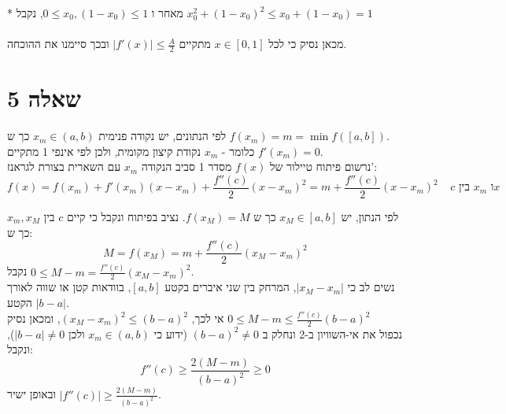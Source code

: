 \documentclass{article}
\begin{document}
* מאחר ו $0\leq x_0, (1-x_0) \leq 1$, נקבל $x_0^2+(1-x_0)^2\leq x_0+(1-x_0)=1$
\\\\
מכאן נסיק כי לכל $x\in[0,1]$ מתקיים $|f'(x)|\leq \frac{A}{2}$ ובכך סיימנו את ההוכחה.

\section*{שאלה 5}

לפי הנתונים, יש נקודה פנימית $x_m\in (a,b)$
כך ש $f(x_m)= m =\min f([a,b])$.\\
כלומר - $x_m$ נקודת קיצון מקומית,
ולכן לפי אינפי 1 מתקיים $f'(x_m)=0$.\\
נרשום פיתוח טיילור של $f(x)$ מסדר 1 סביב הנקודה $x_m$ עם השארית בצורת לגראנז':
\[
    f(x)=f(x_m)+f'(x_m)(x-x_m)+\frac{f''(c)}{2}(x-x_m)^2=
    m + \frac{f''(c)}{2}(x-x_m)^2 \;\;\;\; \text{$c$ בין $x_m$ ו$x$}
\]

לפי הנתון, יש $x_M\in [a,b]$
כך ש $f(x_M)=M$. נציב בפיתוח ונקבל כי קיים $c$ בין $x_m, x_M$ כך ש:
\[
    M=f(x_M) = m + \frac{f''(c)}{2}(x_M-x_m)^2
\]
נקבל $0\leq M-m=\frac{f''(c)}{2}(x_M-x_m)^2$.\\
נשים לב כי $|x_M - x_m|$, המרחק בין שני איברים בקטע $[a,b]$, בוודאות קטן או שווה לאורך הקטע $|b-a|$. \\
אי לכך, $(x_M-x_m)^2\leq (b-a)^2$, ומכאן נסיק $0\leq M-m\leq \frac{f''(c)}{2}(b-a)^2$\\
נכפול את אי-השוויון ב-2 ונחלק ב $(b-a)^2\ne 0$ (ידוע כי $x_m\in (a,b)$ ולכן $|b-a|\ne 0$), ונקבל:
\[
    f''(c)\geq \frac{2(M-m)}{(b-a)^2} \geq 0
\]
ובאופן ישיר $|f''(c)|\geq \frac{2(M-m)}{(b-a)^2}$.
\end{document}
